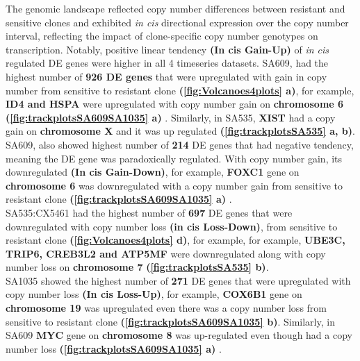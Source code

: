 The genomic landscape reflected copy number differences between resistant and sensitive clones and exhibited \textit{in cis} directional expression over the copy number interval, reflecting the impact of clone-specific copy number genotypes on transcription. 
Notably, positive linear tendency \textbf{(In cis Gain-Up)} of \textit{in cis} regulated DE genes were higher in all 4 timeseries datasets. SA609, had the highest number of \textbf{926 DE genes} that were upregulated with gain in copy number from sensitive to resistant clone \textbf{(\autoref{fig:Volcanoes4plots} a)}, for example, \textbf{ID4 and HSPA} were upregulated with copy number gain on \textbf{chromosome 6} \textbf{(\autoref{fig:trackplotsSA609SA1035} a) }. Similarly, in SA535, \textbf{XIST} had a copy gain on \textbf{chromosome X} and it was up regulated \textbf{(\autoref{fig:trackplotsSA535} a, b)}.
\\
SA609, also showed highest number of \textbf{214} DE genes that had negative tendency, meaning the DE gene was paradoxically regulated. With copy number gain, its downregulated \textbf{(In cis Gain-Down)}, for example, \textbf{FOXC1} gene on \textbf{chromosome 6} was downregulated with a copy number gain from sensitive to resistant clone \textbf{(\autoref{fig:trackplotsSA609SA1035} a) }.
\\
SA535:CX5461 had the highest number of \textbf{697} DE genes that were downregulated with copy number loss \textbf{(in cis Loss-Down)}, from sensitive to resistant clone \textbf{(\autoref{fig:Volcanoes4plots} d)}, for example, for example, \textbf{UBE3C, TRIP6, CREB3L2 and ATP5MF} were downregulated along with copy number loss on \textbf{chromosome 7} \textbf{(\autoref{fig:trackplotsSA535} b)}.
\\
SA1035 showed the highest number of \textbf{271} DE genes that were upregulated with copy number loss \textbf{(In cis Loss-Up)}, for example, \textbf{COX6B1} gene on \textbf{chromosome 19} was upregulated even there was a copy number loss from sensitive to resistant clone \textbf{(\autoref{fig:trackplotsSA609SA1035} b)}. Similarly, in SA609 \textbf{MYC} gene on \textbf{chromosome 8} was up-regulated even though had a copy number loss \textbf{(\autoref{fig:trackplotsSA609SA1035} a) }.


